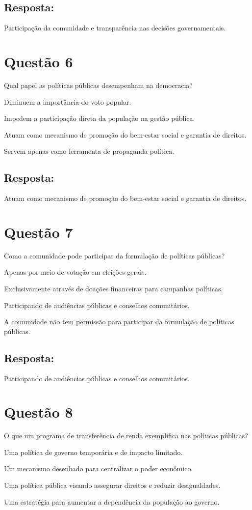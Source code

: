 \documentclass[
   article,       
   12pt,          
   oneside,       
   a4paper,       
   english,       
   brazil,        
   sumario=tradicional
   ]{abntex2}
\begin{document}
\subsection{Resposta:} Participação da comunidade e transparência nas decisões governamentais.
\section{Questão 6}
Qual papel as políticas públicas desempenham na democracia?
\itemize
    \item Diminuem a importância do voto popular.
    \item Impedem a participação direta da população na gestão pública.
    \item Atuam como mecanismo de promoção do bem-estar social e garantia de direitos.
    \item Servem apenas como ferramenta de propaganda política.
\subsection{Resposta:} Atuam como mecanismo de promoção do bem-estar social e garantia de direitos.
\section{Questão 7}
Como a comunidade pode participar da formulação de políticas públicas?
\itemize
    \item Apenas por meio de votação em eleições gerais.
    \item Exclusivamente através de doações financeiras para campanhas políticas.
    \item Participando de audiências públicas e conselhos comunitários.
    \item A comunidade não tem permissão para participar da formulação de políticas públicas.
\subsection{Resposta:} Participando de audiências públicas e conselhos comunitários.
\section{Questão 8}
O que um programa de transferência de renda exemplifica nas políticas públicas?
\itemize
    \item Uma política de governo temporária e de impacto limitado.
    \item Um mecanismo desenhado para centralizar o poder econômico.
    \item Uma política pública visando assegurar direitos e reduzir desigualdades.
    \item Uma estratégia para aumentar a dependência da população ao governo.
\end{document}
